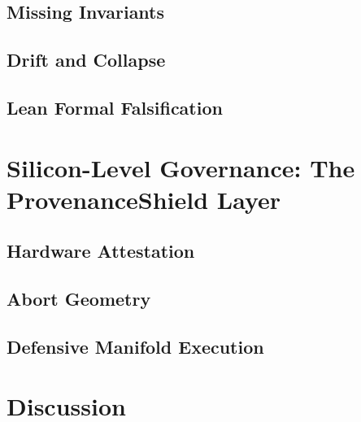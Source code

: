 \subsection{Missing Invariants}

\subsection{Drift and Collapse}

\subsection{Lean Formal Falsification}

\section{Silicon-Level Governance: The ProvenanceShield Layer}
\subsection{Hardware Attestation}

\subsection{Abort Geometry}

\subsection{Defensive Manifold Execution}

\section{Discussion}

